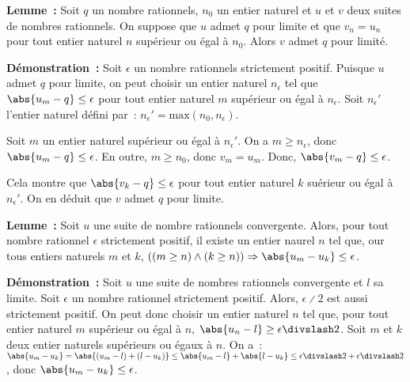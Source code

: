     \done

\medskip

\noindent\textbf{Lemme :} Soit $q$ un nombre rationnels, $n_0$ un entier naturel et $u$ et $v$ deux suites de nombres rationnels. 
    On suppose que $u$ admet $q$ pour limite et que $v_n = u_n$ pour tout entier naturel $n$ supérieur ou égal à $n_0$.
    Alors $v$ admet $q$ pour limité.

\medskip

\noindent\textbf{Démonstration :}
    Soit $\epsilon$ un nombre rationnels strictement positif.
    Puisque $u$ admet $q$ pour limite, on peut choisir un entier naturel $n_\epsilon$ tel que $\abs{u_m - q} \leq \epsilon$ pour tout entier naturel $m$ supérieur ou égal à $n_\epsilon$. 
    Soit $n_\epsilon'$ l'entier naturel défini par : $n_\epsilon' = \mathrm{max} \left( n_0, n_\epsilon \right)$.
    
    Soit $m$ un entier naturel supérieur ou égal à $n_\epsilon'$.
    On a $m \geq n_\epsilon$, donc $\abs{u_m - q} \leq \epsilon$.
    En outre, $m \geq n_0$, donc $v_m = u_m$.
    Donc, $\abs{v_m - q} \leq \epsilon$.
    
    Cela montre que $\abs{v_k - q} \leq \epsilon$ pour tout entier naturel $k$ suérieur ou égal à $n_\epsilon'$. 
    On en déduit que $v$ admet $q$ pour limite.

    \done

\medskip

\noindent\textbf{Lemme :} Soit $u$ une suite de nombre rationnels convergente. 
    Alors, pour tout nombre rationnel $\epsilon$ strictement positif, il existe un entier naurel $n$ tel que, our tous entiers naturels $m$ et $k$, $((m \geq n) \wedge (k \geq n)) \Rightarrow \abs{u_m - u_k} \leq \epsilon$.

\medskip

\noindent\textbf{Démonstration :} Soit $u$ une suite de nombres rationnels convergente et $l$ sa limite.
    Soit $\epsilon$ un nombre rationnel strictement positif. 
    Alors, $\epsilon \divslash 2$ est aussi strictement positif.
    On peut donc choisir un entier naturel $n$ tel que, pour tout entier naturel $m$ supérieur ou égal à $n$, $\abs{u_n - l} \geq \epsilon \divslash 2$.
    Soit $m$ et $k$ deux entier naturels supérieurs ou égaux à $n$. 
    On a : $\abs{u_m - u_k} = \abs{(u_m - l) + (l - u_k)} \leq \abs{u_m - l} + \abs{l - u_k} \leq \epsilon \divslash 2 + \epsilon \divslash 2$, donc $\abs{u_m - u_k} \leq \epsilon$. 

    \done

